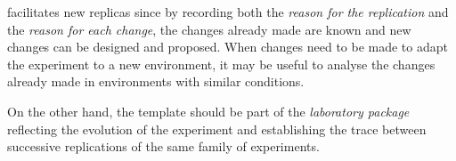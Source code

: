 \begin{itemize}
    \Traceability facilitates new replicas since by recording both the \emph{reason for the replication} and the \emph{reason for each change}, the changes already made are known and new changes can be designed and proposed. When changes need to be made to adapt the experiment to a new environment, it may be useful to analyse the changes already made in environments with similar conditions.
     
    On the other hand, the template should be part of the \emph{laboratory package} reflecting the evolution of the experiment and establishing the trace between successive replications of the same family of experiments. \\

\end{itemize}


